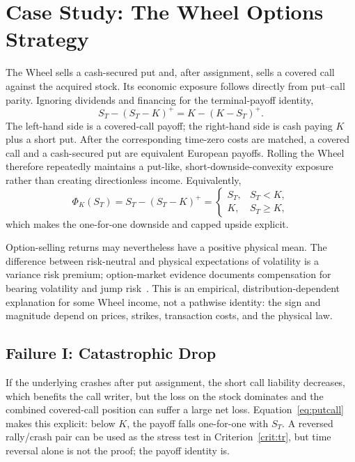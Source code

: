 \documentclass[aps,pra,reprint,superscriptaddress,amsmath,amssymb,floatfix]{revtex4-2}
\theoremstyle{plain}
\theoremstyle{definition}
\theoremstyle{remark}
\begin{document}
\section{Case Study: The Wheel Options Strategy}
\label{sec:wheel}

The Wheel sells a cash-secured put and, after assignment, sells a covered call
against the acquired stock. Its economic exposure follows directly from
put--call parity. Ignoring dividends and financing for the terminal-payoff
identity,
\begin{equation}
  S_T-(S_T-K)^+
  =K-(K-S_T)^+.
  \label{eq:putcall}
\end{equation}
The left-hand side is a covered-call payoff; the right-hand side is cash
paying \(K\) plus a short put. After the corresponding time-zero costs are
matched, a covered call and a cash-secured put are equivalent European
payoffs. Rolling the Wheel therefore repeatedly maintains a put-like,
short-downside-convexity exposure rather than creating directionless income.
Equivalently,
\begin{equation}
  \Phi_K(S_T)
  =S_T-(S_T-K)^+
  =
  \begin{cases}
    S_T,&S_T<K,\\
    K,&S_T\geq K,
  \end{cases}
  \label{eq:wheelpiecewise}
\end{equation}
which makes the one-for-one downside and capped upside explicit.

Option-selling returns may nevertheless have a positive physical mean. The
difference between risk-neutral and physical expectations of volatility is a
variance risk premium; option-market evidence documents compensation for
bearing volatility and jump risk~\cite{BakshiKapadia2003,CarrWu2009}. This is
an empirical, distribution-dependent explanation for some Wheel income, not a
pathwise identity: the sign and magnitude depend on prices, strikes,
transaction costs, and the physical law.

\subsection{Failure I: Catastrophic Drop}

If the underlying crashes after put assignment, the short call liability
decreases, which benefits the call writer, but the loss on the stock dominates
and the combined covered-call position can suffer a large net loss.
Equation~\eqref{eq:putcall} makes this explicit: below \(K\), the payoff falls
one-for-one with \(S_T\). A reversed rally/crash pair can be used as the stress
test in Criterion~\ref{crit:tr}, but time reversal alone is not the proof; the
payoff identity is.
\end{document}
